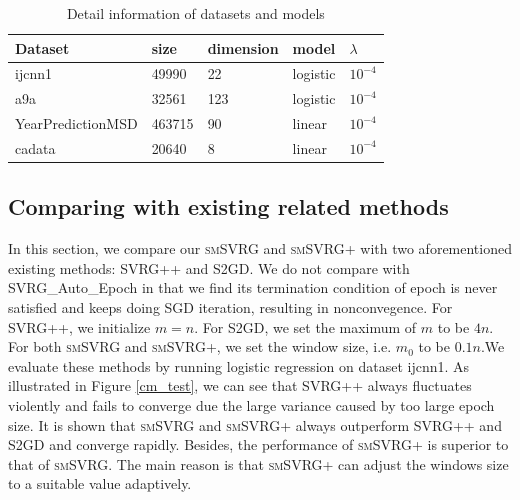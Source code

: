 \documentclass[conference]{IEEEtran}
\begin{document}
\begin{table}[]
\centering
\caption{Detail information of datasets and models}
\label{data information}
\begin{tabular}{|l|l|l|l|l|}
\hline
Dataset           & size & dimension & model & $\lambda$ \\ \hline
ijcnn1            &  49990 &  22 &   logistic    &  $10^{-4}$         \\
a9a               &   32561&123   &     logistic  &      $10^{-4}$     \\ 
YearPredictionMSD & 463715  &  90 &    linear  &      $10^{-4}$     \\
cadata              & 20640  &8   &     linear  &    $10^{-4}$       \\ \hline
\end{tabular}
\end{table}



\subsection{Comparing with existing related methods}
In this section, we compare our \textsc{smSVRG} and \textsc{smSVRG+} with two aforementioned existing methods: SVRG++ and S2GD. We do not compare with SVRG\_Auto\_Epoch in that we find its termination condition of epoch is never satisfied and keeps doing SGD iteration, resulting in nonconvegence. For SVRG++, we initialize $m = n$. For S2GD, we set the maximum of $m$ to be $4n$. For both \textsc{smSVRG} and \textsc{smSVRG+}, we set the window size, i.e. $m_0$ to be $0.1n$.We evaluate these methods by running logistic regression on dataset ijcnn1. 
As illustrated in Figure \ref{cm_test}, we can see that SVRG++ always fluctuates violently and fails to converge due the large variance caused by too large epoch size. It is shown that \textsc{smSVRG} and \textsc{smSVRG+} always outperform SVRG++ and S2GD and converge rapidly. Besides, the performance of \textsc{smSVRG+} is superior to that of \textsc{smSVRG}. The main reason is that \textsc{smSVRG+} can adjust the windows size to a suitable value adaptively.
\end{document}
